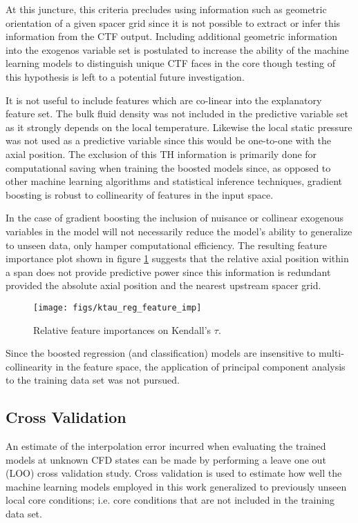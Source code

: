 At this juncture, this criteria precludes using information such as geometric orientation of a given spacer grid since it is not possible to extract or infer this information from the CTF output.  Including additional geometric information into the exogenos variable set is postulated to increase the ability of the machine learning models to distinguish unique CTF faces in the core though testing of this hypothesis is left to a potential future investigation.

It is not useful to include features which are co-linear into the explanatory feature set. The bulk fluid density was not included in the predictive variable set as it strongly depends on the local temperature. Likewise the local static pressure was not used as a predictive variable since this would be one-to-one with the axial position.  The exclusion of this TH information is primarily done for computational saving when training the boosted models since, as opposed to other machine learning algorithms and statistical inference techniques, gradient boosting is robust to collinearity of features in the input space.

In the case of gradient boosting the inclusion of nuisance or collinear exogenous variables in the model will not necessarily reduce the model's ability to generalize to unseen data, only hamper computational efficiency.  The resulting feature importance plot shown in figure \ref{fig:ktauregfeatureimp} suggests that the relative axial position within a span does not provide predictive power since this information is redundant provided the absolute axial position and the nearest upstream spacer grid.

\begin{figure}[H]
    \centering
    \texttt{[image: figs/ktau\_reg\_feature\_imp]}
    \caption[Relative feature importance.]{Relative feature importances on Kendall's $\tau$.}
    \label{fig:ktauregfeatureimp}
\end{figure}

Since the boosted regression (and classification) models are insensitive to multi-collinearity in the feature space, the application of principal component analysis to the training data set was not pursued.


\subsection{Cross Validation}

An estimate of the interpolation error incurred when evaluating the trained models at unknown CFD states can be made by performing a leave one out (LOO) cross validation study.  Cross validation is used to estimate how well the machine learning models employed in this work generalized to previously unseen local core conditions; i.e. core conditions that are not included in the training data set.

